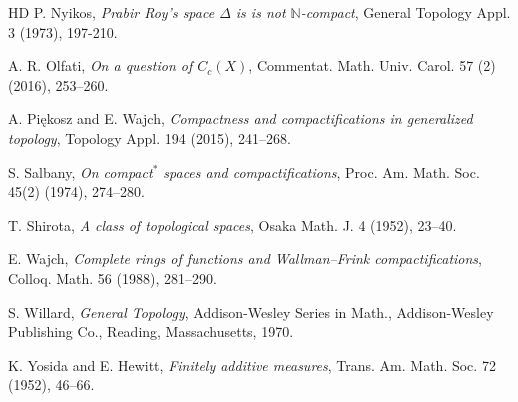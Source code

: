 \documentclass[12pt,twoside,leqno]{article}
\theoremstyle{plain}
\theoremstyle{definition}
\theoremstyle{remark}
\begin{document}
\begin{thebibliography}{HD}
 P. Nyikos, {\it Prabir Roy's space $\Delta$ is is not $\mathbb{N}$-compact}, General Topology Appl. 3 (1973), 197-210.

 A. R. Olfati, {\it On a question of $C_c(X)$}, Commentat. Math. Univ. Carol. 57 (2) (2016), 253--260.

 A. Pi\k{e}kosz and E. Wajch, {\it Compactness and compactifications in generalized topology}, Topology Appl. 194 (2015), 241--268.

 S. Salbany, {\it On compact$^{\ast}$ spaces and compactifications}, Proc. Am. Math. Soc. 45(2) (1974), 274--280.

 T. Shirota, {\it A class of topological spaces}, Osaka Math. J. 4 (1952), 23--40.

 E. Wajch, {\it Complete rings of functions and Wallman--Frink compactifications}, Colloq. Math. 56 (1988), 281–290.

 S. Willard, {\it General Topology}, Addison-Wesley Series in Math., Addison-Wesley Publishing Co., Reading, Massachusetts, 1970.

 K. Yosida and E. Hewitt, {\it Finitely additive measures}, Trans. Am. Math. Soc. 72 (1952), 46--66.

\end{thebibliography}
\end{document}
